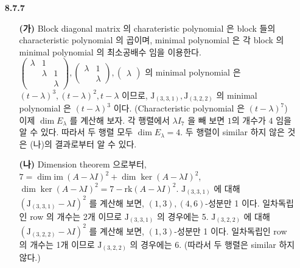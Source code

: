 \documentclass[12pt]{report}
\newcommand*{\im}{\text{im}\:}%
\begin{document}
\begin{itemize}
\item[\textbf{8.7.7}] 
	\begin{itemize}
		\item[\textbf{(가)}] Block diagonal matrix 의 charateristic polynomial 은 block 들의 characteristic polynomial 의 곱이며, minimal polynomial 은 각 block 의 minimal polynomial 의 최소공배수 임을 이용한다. \\
		$\begin{pmatrix}\lambda&1&\\&\lambda&1\\&&\lambda\end{pmatrix}, \begin{pmatrix}\lambda&1\\&\lambda\end{pmatrix}, \begin{pmatrix}\lambda\end{pmatrix}$ 의 minimal polynomial 은 $(t-\lambda)^3, (t-\lambda)^2, t-\lambda$ 이므로, $\mathrm{J}_{(3, 3, 1)}, \mathrm{J}_{(3, 2, 2)}$ 의 minimal polynomial 은 $(t-\lambda)^3$ 이다. (Characteristic polynomial 은 $(t-\lambda)^7$) 이제 $\dim E_\lambda$ 를 계산해 보자. 각 행렬에서 $\lambda I_7$ 을 빼 보면 $1$의 개수가 $4$ 임을 알 수 있다. 따라서 두 행렬 모두 $\dim E_\lambda= 4$. 두 행렬이 similar 하지 않은 것은 (나)의 결과로부터 알 수 있다.
		\item[\textbf{(나)}] Dimension theorem 으로부터, $7 = \dim \im(A-\lambda I)^2 + \dim \ker (A-\lambda I)^2$, $\dim \ker (A-\lambda I)^2 = 7 - \mathrm{rk} (A-\lambda I)^2$. $\mathrm{J}_{(3, 3, 1)}$ 에 대해 $(\mathrm{J}_{(3, 3, 1)}-\lambda I)^2$ 를 계산해 보면, $(1, 3), (4, 6)$-성분만 1 이다. 일차독립인 row 의 개수는 2개 이므로 $\mathrm{J}_{(3, 3, 1)}$ 의 경우에는 5. $\mathrm{J}_{(3, 2, 2)}$ 에 대해 $(\mathrm{J}_{(3, 2, 2)}-\lambda I)^2$ 를 계산해 보면, $(1, 3)$-성분만 1 이다. 일차독립인 row 의 개수는 1개 이므로 $\mathrm{J}_{(3, 2, 2)}$ 의 경우에는 6. (따라서 두 행렬은 similar 하지 않다.)
	\end{itemize}              
\end{itemize}
\end{document}
